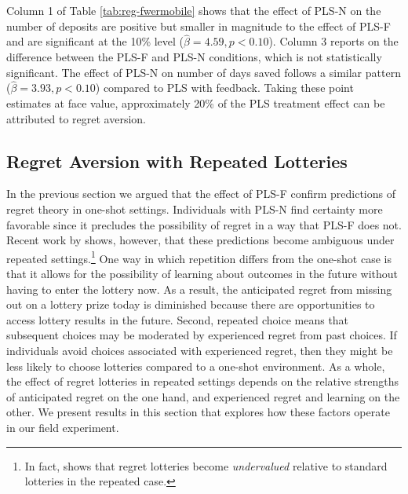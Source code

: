 \documentclass[12pt, titlepage]{article}
\begin{document}
		Column 1 of Table \ref{tab:reg-fwermobile} shows that the effect of PLS-N on the number of deposits are positive but smaller in magnitude to the effect of PLS-F and are significant at the 10\% level ($\hat \beta = 4.59, p < 0.10$). Column 3 reports on the difference between the PLS-F and PLS-N conditions, which is not statistically significant. The effect of PLS-N on number of days saved follows a similar pattern ($\hat \beta = 3.93, p < 0.10$) compared to PLS with feedback. Taking these point estimates at face value, approximately 20\% of the PLS treatment effect can be attributed to regret aversion.

	\subsection{Regret Aversion with Repeated Lotteries}

		In the previous section we argued that the effect of PLS-F confirm predictions of regret theory in one-shot settings. Individuals with PLS-N find certainty more favorable since it precludes the possibility of regret in a way that PLS-F does not. Recent work by \textcite{imas_regret_2016} shows, however, that these predictions become ambiguous under repeated settings.\footnote{In fact, \textcite{imas_regret_2016} shows that regret lotteries become \emph{undervalued} relative to standard lotteries in the repeated case.} One way in which repetition differs from the one-shot case is that it allows for the possibility of learning about outcomes in the future without having to enter the lottery now. As a result, the anticipated regret from missing out on a lottery prize today is diminished because there are opportunities to access lottery results in the future. Second, repeated choice means that subsequent choices may be moderated by experienced regret from past choices. If individuals avoid choices associated with experienced regret, then they might be less likely to choose lotteries compared to a one-shot environment. As a whole, the effect of regret lotteries in repeated settings depends on the relative strengths of anticipated regret on the one hand, and experienced regret and learning on the other. We present results in this section that explores how these factors operate in our field experiment.

		
\end{document}
